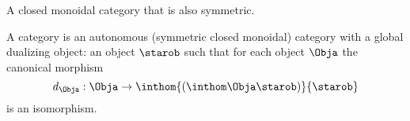 %
%

\begin{definition}
    \label{def:autonomous-category}
    A closed monoidal category that is also symmetric.
\end{definition}

\begin{definition}
    \label{def:star-autonomous-category}
    A \starautonomous category is an autonomous (symmetric closed monoidal) category with a global dualizing object: an object $\starob$ such that for each object $\Obja$ the canonical morphism
    \begin{equation}
        d_{\Obja}: \Obja \to \inthom{(\inthom\Obja\starob)}{\starob}
    \end{equation}
    is an isomorphism.
\end{definition}
